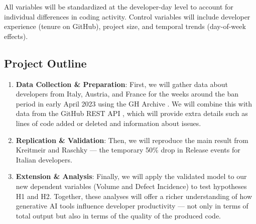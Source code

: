 All variables will be standardized at the developer-day level to account for individual differences in coding activity. Control variables will include developer experience (tenure on GitHub), project size, and temporal trends (day-of-week effects).


\subsection*{Project Outline}

\begin{enumerate}
  \item \textbf{Data Collection \& Preparation}: First, we will gather data about developers from Italy, Austria, and France for the weeks around the ban period in early April 2023 using the GH Archive \cite{github_archive}. We will combine this with data from the GitHub REST API \cite{github_api}, which will provide extra details such as lines of code added or deleted and information about issues.
  \item \textbf{Replication \& Validation}: Then, we will reproduce the main result from Kreitmeir and Raschky — the temporary 50\% drop in Release events for Italian developers.
  \item \textbf{Extension \& Analysis}: Finally, we will apply the validated model to our new dependent variables (Volume and Defect Incidence) to test hypotheses H1 and H2. Together, these analyses will offer a richer understanding of how generative AI tools influence developer productivity — not only in terms of total output but also in terms of the quality of the produced code.
\end{enumerate}

